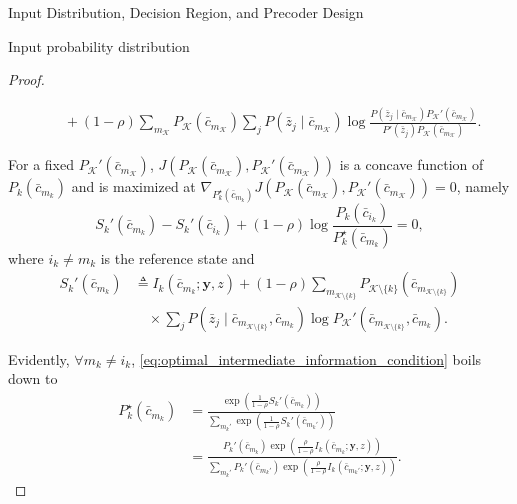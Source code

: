 \documentclass[journal]{IEEEtran}
\begin{document}
\begin{section}{Input Distribution, Decision Region, and Precoder Design}
\begin{subsection}{Input probability distribution}
\begin{proof}
\begin{figure*}[!b]
\begin{align}
						& \quad + (1 - \rho) \sum_{m_{\mathcal{K}}} P_{\mathcal{K}}(\bar{c}_{m_{\mathcal{K}}}) \sum_j P(\bar{z}_j \mid \bar{c}_{m_{\mathcal{K}}}) \log \frac{P(\bar{z}_j \mid \bar{c}_{m_{\mathcal{K}}}) P_{\mathcal{K}}'(\bar{c}_{m_{\mathcal{K}}})}{P'(\bar{z}_j) P_{\mathcal{K}}(\bar{c}_{m_{\mathcal{K}}})}.
						\label{eq:intermediate_information_function}
					\end{align}
				\end{figure*}
				For a fixed $P_{\mathcal{K}}'(\bar{c}_{m_{\mathcal{K}}})$, $J \left( P_{\mathcal{K}}(\bar{c}_{m_{\mathcal{K}}}),P_{\mathcal{K}}'(\bar{c}_{m_{\mathcal{K}}}) \right)$ is a concave function of $P_k(\bar{c}_{m_k})$ and is maximized at $\nabla_{P_k^{\star}(\bar{c}_{m_k})} J \left( P_{\mathcal{K}}(\bar{c}_{m_{\mathcal{K}}}),P_{\mathcal{K}}'(\bar{c}_{m_{\mathcal{K}}}) \right) = 0$, namely
				\begin{equation}
					S_k'(\bar{c}_{m_k}) - S_k'(\bar{c}_{i_k}) + (1 - \rho) \log \frac{P_k(\bar{c}_{i_k})}{P_k^{\star}(\bar{c}_{m_k})} = 0,
					\label{eq:optimal_intermediate_information_condition}
				\end{equation}
				where $i_k \ne m_k$ is the reference state and
				\begin{align}
					S_k'(\bar{c}_{m_k})
					& \triangleq I_k(\bar{c}_{m_k};\boldsymbol{y},z) + (1 - \rho) \sum_{m_{\mathcal{K} \setminus \{k\}}} P_{\mathcal{K} \setminus \{k\}}(\bar{c}_{m_{\mathcal{K} \setminus \{k\}}})\nonumber\\
					& \quad \times \sum_j P(\bar{z}_j \mid \bar{c}_{m_{\mathcal{K} \setminus \{k\}}},\bar{c}_{m_k}) \log P_{\mathcal{K}}'(\bar{c}_{m_{\mathcal{K} \setminus \{k\}}},\bar{c}_{m_k}).
				\end{align}

				Evidently, $\forall m_k \ne i_k$, \eqref{eq:optimal_intermediate_information_condition} boils down to
				\begin{subequations}
					\begin{align}
						P_k^{\star}(\bar{c}_{m_k})
						& = \frac{\exp \left( \frac{1}{1 - \rho} S_k'(\bar{c}_{m_k}) \right)}{\sum_{m_k'} \exp \left( \frac{1}{1 - \rho} S_k'(\bar{c}_{m_k'}) \right)}\\
						& = \frac{P_k'(\bar{c}_{m_k}) \exp \left( \frac{\rho}{1 - \rho} I_k(\bar{c}_{m_k};\boldsymbol{y},z) \right)}{\sum_{m_k'} P_k'(\bar{c}_{m_k'}) \exp \left( \frac{\rho}{1 - \rho} I_k(\bar{c}_{m_k'};\boldsymbol{y},z) \right)}.
						\label{eq:optimal_relative_distribution}
					\end{align}
				\end{subequations}


\end{proof}
\end{subsection}
\end{section}
\end{document}
